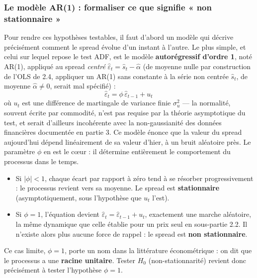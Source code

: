 \documentclass{article}
\begin{document}
\subsubsection*{Le modèle AR(1) : formaliser ce que signifie « non stationnaire »}
Pour rendre ces hypothèses testables, il faut d'abord un modèle qui décrive précisément comment le spread évolue d'un instant à l'autre. Le plus simple, et celui sur lequel repose le test ADF, est le modèle \textbf{autorégressif d'ordre 1}, noté AR(1), appliqué au spread \emph{centré} $\hat\varepsilon_t=\hat s_t-\hat\alpha$ (de moyenne nulle par construction de l'OLS de 2.4, appliquer un AR(1) sans constante à la série non centrée $\hat s_t$, de moyenne $\hat\alpha\neq 0$, serait mal spécifié) :
\begin{equation}
\hat{\varepsilon}_t = \phi\, \hat{\varepsilon}_{t-1} + u_t\,
\end{equation}
où $u_t$ est une différence de martingale de variance finie $\sigma_u^2$ --- la normalité, souvent écrite par commodité, n'est pas requise par la théorie asymptotique du test, et serait d'ailleurs incohérente avec la non-gaussianité des données financières documentée en partie 3. Ce modèle énonce que la valeur du spread aujourd'hui dépend linéairement de sa valeur d'hier, à un bruit aléatoire près. Le paramètre $\phi$ en est le cœur : il détermine entièrement le comportement du processus dans le temps.
\begin{itemize}
\item Si $|\phi| < 1$, chaque écart par rapport à zéro tend à se résorber progressivement : le processus revient vers sa moyenne. Le spread est \textbf{stationnaire} (asymptotiquement, sous l'hypothèse que $u_t$ l'est).
\item Si $\phi = 1$, l'équation devient $\hat{\varepsilon}_t = \hat{\varepsilon}_{t-1} + u_t$, exactement une marche aléatoire, la même dynamique que celle établie pour un prix seul en sous-partie 2.2. Il n'existe alors plus aucune force de rappel : le spread est \textbf{non stationnaire}.
\end{itemize}
Ce cas limite, $\phi = 1$, porte un nom dans la littérature économétrique : on dit que le processus a une \textbf{racine unitaire}. Tester $H_0$ (non-stationnarité) revient donc précisément à tester l'hypothèse $\phi = 1$.
\end{document}
